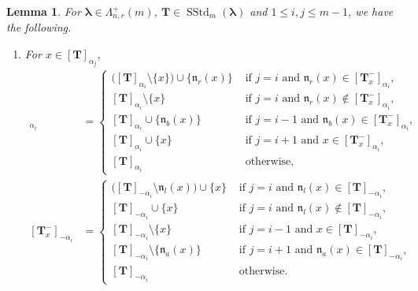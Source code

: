 \documentclass[12pt]{amsart}
\newtheorem{lem}[thm]{Lemma}
\numberwithin{equation}{thm}
\newcommand\bT{\mathbf T}
\newcommand\fn{\mathfrak n}
\renewcommand\a{\alpha}  %
\newcommand\vL{\varLambda}
\newcommand\Bla{\boldsymbol\lambda}
\newcommand{\SStd}{\operatorname{SStd}}
\begin{document}
\begin{lem}
\label{Lemma bTx- ai}
For $\Bla \in \vL_{n,r}^+(m)$, $\bT \in \SStd_m(\Bla)$ and $1 \leq i,j \leq m-1$, 
we have the following. 
\begin{enumerate} 
\item 
For $x \in [\bT]_{\a_j}$,  
\begin{align*}
[\bT_x^-]_{\a_i} 
	&= \begin{cases}
	\big( [\bT]_{\a_i} \setminus \{x\} \big) \cup \{ \fn_r(x)\} 
		& \text{ if } j=i \text{ and } \fn_r(x) \in [\bT_x^-]_{\a_i}, 
	\\ 
	[\bT]_{\a_i} \setminus \{x \} & \text{ if } j=i \text{ and } \fn_r (x) \not\in [\bT_x^-]_{\a_i}, 
	\\
	[\bT]_{\a_i} \cup \{\fn_b(x)\} & \text{ if } j=i-1 \text{ and } \fn_b (x) \in [\bT_x^-]_{\a_i}, 
	\\ 
	[\bT]_{\a_i} \cup \{x\} & \text{ if } j=i+1 \text{ and } x \in [\bT_x^-]_{\a_i},  
	\\
	[\bT]_{\a_i} & \text{ otherwise}, 
	\end{cases}
\\
[\bT_x^-]_{-\a_i} 
	&= \begin{cases}
		\big( [\bT]_{-\a_i} \setminus \fn_l(x) \big) \cup \{x\} 
			& \text{ if } j=i \text{ and } \fn_l(x) \in [\bT]_{-\a_i}, 
		\\
		[\bT]_{-\a_i} \cup \{x\} 
			& \text{ if } j=i \text{ and } \fn_l(x) \not\in [\bT]_{-\a_i}, 
		\\
		[\bT]_{-\a_i} \setminus \{x\} & \text{ if } j=i-1 \text{ and } x \in [\bT]_{-\a_i}, 
		\\
		[\bT]_{-\a_i} \setminus \{\fn_a(x)\} & \text{ if } j=i+1 \text{ and } \fn_a (x) \in [\bT]_{-\a_i}, 
		\\ 
		[\bT]_{-\a_i} & \text{ otherwise}. 
	\end{cases}
\end{align*}


\end{enumerate}
\end{lem}
\end{document}
